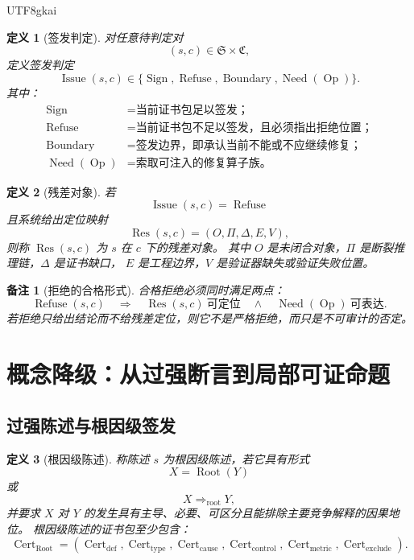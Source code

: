 \documentclass[12pt]{article}
\newtheorem{definition}{定义}[section]
\newtheorem{remark}{备注}[section]
\newcommand{\Stmt}{\mathfrak S}
\newcommand{\Ctx}{\mathfrak C}
\newcommand{\Cert}{\operatorname{Cert}}
\newcommand{\Issue}{\operatorname{Issue}}
\newcommand{\Refuse}{\operatorname{Refuse}}
\newcommand{\Sign}{\operatorname{Sign}}
\newcommand{\Boundary}{\operatorname{Boundary}}
\newcommand{\Need}{\operatorname{Need}}
\newcommand{\Op}{\operatorname{Op}}
\newcommand{\Res}{\operatorname{Res}}
\newcommand{\Root}{\operatorname{Root}}
\begin{document}
\begin{CJK*}{UTF8}{gkai}
\begin{definition}[签发判定]
对任意待判定对
\[
  (s,c)\in \Stmt\times\Ctx,
\]
定义签发判定
\[
  \Issue(s,c)\in
  \{\Sign,\Refuse,\Boundary,\Need(\Op)\}.
\]
其中：
\[
\begin{aligned}
  \Sign&=\text{当前证书包足以签发；}\\
  \Refuse&=\text{当前证书包不足以签发，且必须指出拒绝位置；}\\
  \Boundary&=\text{签发边界，即承认当前不能或不应继续修复；}\\
  \Need(\Op)&=\text{索取可注入的修复算子族。}
\end{aligned}
\]
\end{definition}

\begin{definition}[残差对象]
若
\[
  \Issue(s,c)=\Refuse
\]
且系统给出定位映射
\[
  \Res(s,c)
  =
  (O,\Pi,\Delta,E,V),
\]
则称 \(\Res(s,c)\) 为 \(s\) 在 \(c\) 下的残差对象。
其中 \(O\) 是未闭合对象，\(\Pi\) 是断裂推理链，\(\Delta\) 是证书缺口，
\(E\) 是工程边界，\(V\) 是验证器缺失或验证失败位置。
\end{definition}

\begin{remark}[拒绝的合格形式]
合格拒绝必须同时满足两点：
\[
  \Refuse(s,c)
  \quad\Longrightarrow\quad
  \Res(s,c)\ \text{可定位}
  \quad\wedge\quad
  \Need(\Op)\ \text{可表达}.
\]
若拒绝只给出结论而不给残差定位，则它不是严格拒绝，而只是不可审计的否定。
\end{remark}

\section{概念降级：从过强断言到局部可证命题}
\label{sec:tex52-downgrade}

\subsection{过强陈述与根因级签发}
\label{subsec:tex52-strong-statement}

\begin{definition}[根因级陈述]
称陈述 \(s\) 为根因级陈述，若它具有形式
\[
  X=\Root(Y)
\]
或
\[
  X\Rightarrow_{\mathrm{root}} Y,
\]
并要求 \(X\) 对 \(Y\) 的发生具有主导、必要、可区分且能排除主要竞争解释的因果地位。
根因级陈述的证书包至少包含：
\[
  \Cert_{\Root}
  =
  (\Cert_{\mathrm{def}},
   \Cert_{\mathrm{type}},
   \Cert_{\mathrm{cause}},
   \Cert_{\mathrm{control}},
   \Cert_{\mathrm{metric}},
   \Cert_{\mathrm{exclude}}).
\]
\end{definition}


\end{CJK*}
\end{document}
